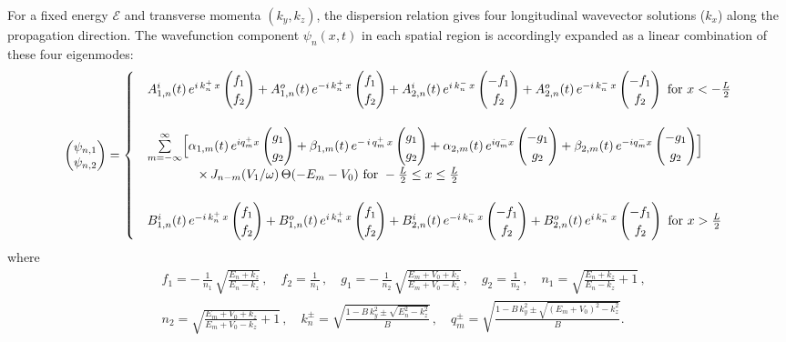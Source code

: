 \documentclass[aps,prb,onecolumn,longbibliography,nofootinbib,citeautoscript,10pt]{revtex4-2}
\def \nn{\nonumber \\}
\def\nn{\nonumber \\}
\newcommand\pmtx[1]{\begin{pmatrix}#1\end{pmatrix}} %
\def \nn{\nonumber \\}
\begin{document}
For a fixed energy $\mathcal{E}$ and transverse momenta $(k_y, k_z)$, the dispersion relation gives four longitudinal wavevector solutions ($k_x$) along the propagation direction. The wavefunction component $\psi_{n}(x,t)$ in each spatial region is accordingly expanded as a linear combination of these four eigenmodes:
\begin{align} 
\label{eq:nodal_two_propagator}
\pmtx{\psi_{n,1}  \\ \psi_{n,2} } =
\begin{cases}
& A_{1,n}^{i}(t) \,e^{ i\, k_n^+ \, x} \pmtx{ f_1  \\  f_2 }
+ A_{1,n}^{o}(t) \,e^{- i\, k_n^+ \, x} \pmtx{ f_1  \\  f_2 }
+ A_{2,n}^{i}(t) \,e^{ i\, k_n^- \, x} \pmtx{- f_1  \\  f_2 }
+ A_{2,n}^{o}(t) \,e^{- i\, k_n^- \, x} \pmtx{- f_1  \\  f_2 }
 \text{ for } x< -\frac{L} {2}   \\ & \\
& \sum \limits_{m=-\infty}^\infty
\Bigl[ \alpha_{1,m}(t) \,e^{i q_m^+ x} \pmtx{ g_1  \\ g_2}
+ \beta_{1,m}(t) \, e^{-\,i \, q_m^+ \, x} \pmtx{ g_1  \\ g_2}
+ \alpha_{2,m}(t) \,e^{i q_m^- x} \pmtx{- g_1  \\ g_2}
+ \beta_{2,m}(t) \,e^{-i q_m^- x} \pmtx{- g_1  \\ g_2} \Bigr] \\
& \qquad \qquad \times \, J_{n-m} ( {V_{1}} / {\omega} ) \, \Theta(-E_m-V_0)
 \text{ for } -\frac{L} {2} \le x \le \frac{L} {2}   \\ & \\
& B_{1,n}^{i}(t) \,e^{- i\, k_n^+ \, x} \pmtx{ f_1  \\  f_2 }
+ B_{1,n}^{o}(t) \,e^{ i\, k_n^+ \, x} \pmtx{ f_1  \\  f_2 }
+ B_{2,n}^{i}(t) \,e^{- i\, k_n^- \, x} \pmtx{- f_1  \\  f_2 }
+ B_{2,n}^{o}(t) \,e^{ i\, k_n^- \, x} \pmtx{- f_1  \\  f_2 }
 \text{ for } x> \frac{L} {2}
\end{cases}
\end{align}
where
\begin{align}
\label{eqnodalx}
&  f_1  = -\,\frac{1} {n_1} \, \sqrt{\frac{E_n +k_z} {E_n -k_z}} \,,  \quad
 f_2  = \frac{1} {n_1} \,, \quad  g_1  =  -\,\frac{ 1} {n_2} \,\sqrt{\frac{E_m +V_0 +k_z} {E_m+ V_0 -k_z}} \,,  \quad
g_2 = \frac{1} {n_2} \,,  \quad 
n_1 = \sqrt{\frac{E_n +k_z} {E_n-k_z}+1} \,, \nn &
n_2 = \sqrt{\frac{E_m +V_0 +k_z} {E_m +V_0-k_z}+1} \,,  \quad 	 
k_n ^{\pm} = \sqrt{\frac{1-B\, k_y^2 \pm \sqrt{E_n^2-k_z^2}} {B}} \,,  \quad
q_m ^{\pm}= \sqrt{\frac{1-B\, k_y^2 \pm \sqrt{(E_m+V_0)^2-k_z^2}} {B}}.
\end{align}
\end{document}

